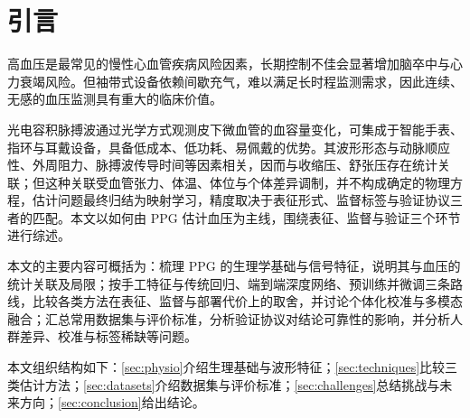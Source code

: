 \section{引言}
\label{sec:intro}

高血压是最常见的慢性心血管疾病风险因素，长期控制不佳会显著增加脑卒中与心力衰竭风险\cite{kario2024who}。但袖带式设备依赖间歇充气，难以满足长时程监测需求，因此连续、无感的血压监测具有重大的临床价值。

光电容积脉搏波通过光学方式观测皮下微血管的血容量变化，可集成于智能手表、指环与耳戴设备，具备低成本、低功耗、易佩戴的优势。其波形形态与动脉顺应性、外周阻力、脉搏波传导时间等因素相关，因而与收缩压、舒张压存在统计关联\cite{charlton2022wearable,tang2026sifpbpnet}；但这种关联受血管张力、体温、体位与个体差异调制，并不构成确定的物理方程，估计问题最终归结为映射学习，精度取决于表征形式、监督标签与验证协议三者的匹配。本文以如何由 PPG 估计血压为主线，围绕表征、监督与验证三个环节进行综述。

\noindent 本文的主要内容可概括为：梳理 PPG 的生理学基础与信号特征，说明其与血压的统计关联及局限；按手工特征与传统回归、端到端深度网络、预训练并微调三条路线，比较各类方法在表征、监督与部署代价上的取舍，并讨论个体化校准与多模态融合；汇总常用数据集与评价标准，分析验证协议对结论可靠性的影响，并分析人群差异、校准与标签稀缺等问题。

本文组织结构如下：\cref{sec:physio}介绍生理基础与波形特征；\cref{sec:techniques}比较三类估计方法；\cref{sec:datasets}介绍数据集与评价标准；\cref{sec:challenges}总结挑战与未来方向；\cref{sec:conclusion}给出结论。